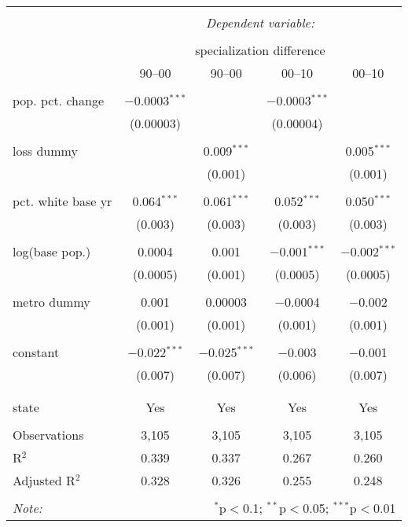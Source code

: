 \documentclass[12pt]{article}
\begin{document}
\begin{table}[p] \centering 
\begin{tabular}{@{\extracolsep{5pt}}lcccc} 
\\[-1.8ex]\hline 
\hline \\[-1.8ex] 
 & \multicolumn{4}{c}{\textit{Dependent variable:}} \\ 
\cline{2-5} 
\\[-1.8ex] & \multicolumn{4}{c}{specialization difference} \\ 
 & 90--00 & 90--00 & 00--10 & 00--10 \\ 
\hline \\[-1.8ex] 
 pop. pct. change & $-$0.0003$^{***}$ &  & $-$0.0003$^{***}$ &  \\ 
  & (0.00003) &  & (0.00004) &  \\ 
  & & & & \\ 
 loss dummy &  & 0.009$^{***}$ &  & 0.005$^{***}$ \\ 
  &  & (0.001) &  & (0.001) \\ 
  & & & & \\ 
 pct. white base yr & 0.064$^{***}$ & 0.061$^{***}$ & 0.052$^{***}$ & 0.050$^{***}$ \\ 
  & (0.003) & (0.003) & (0.003) & (0.003) \\ 
  & & & & \\ 
 log(base pop.) & 0.0004 & 0.001 & $-$0.001$^{***}$ & $-$0.002$^{***}$ \\ 
  & (0.0005) & (0.001) & (0.0005) & (0.0005) \\ 
  & & & & \\ 
 metro dummy & 0.001 & 0.00003 & $-$0.0004 & $-$0.002 \\ 
  & (0.001) & (0.001) & (0.001) & (0.001) \\ 
  & & & & \\ 
 constant & $-$0.022$^{***}$ & $-$0.025$^{***}$ & $-$0.003 & $-$0.001 \\ 
  & (0.007) & (0.007) & (0.006) & (0.007) \\ 
  & & & & \\ 
\hline \\[-1.8ex] 
state & Yes & Yes & Yes & Yes \\ 
\hline \\[-1.8ex] 
Observations & 3,105 & 3,105 & 3,105 & 3,105 \\ 
R$^{2}$ & 0.339 & 0.337 & 0.267 & 0.260 \\ 
Adjusted R$^{2}$ & 0.328 & 0.326 & 0.255 & 0.248 \\ 
\hline 
\hline \\[-1.8ex] 
\textit{Note:}  & \multicolumn{4}{r}{$^{*}$p$<$0.1; $^{**}$p$<$0.05; $^{***}$p$<$0.01} \\ 
\end{tabular} 
\end{table} 
\end{document}
